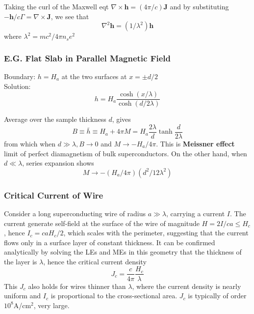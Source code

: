 \documentclass[8pt,a4paper,twocolumn]{article} %
\numberwithin{equation}{section} %
\begin{document}
			Taking the curl of the Maxwell eqt $ \nabla\times\bm h=(4 \pi/c)\bm J $ and by substituting $-\bm h/c \Gamma = \nabla\times\bm J$, we see that
			\begin{equation}
				\nabla^2\bm h=(1/\lambda^2)\bm h
			\end{equation}
			where $ \lambda^2=mc^2/4 \pi n_s e^2 $

			\subsubsection{E.G. Flat Slab in Parallel Magnetic Field} %
			\label{subs:e_g_flat_slab_in_parallel_magnetic_field}
				Boundary: $h=H_a$ at the two surfaces at $x=\pm d/2$\\
				Solution:
				\begin{equation}
					h=H_a \frac{\cosh (x/\lambda)}{\cosh(d/2 \lambda	)}
				\end{equation}

				Average over the sample thickness $d$, gives
				\begin{equation}
				B\equiv \bar h \equiv H_a +4 \pi M = H_a \frac{2 \lambda}{d}\tanh \frac{d}{2 \lambda}
				\end{equation}
				from which when $d\gg \lambda, B\rightarrow 0$ and $M\rightarrow -H_a/4 \pi $. This is \textbf{Meissner effect} limit of perfect diamagnetism of bulk superconductors. On the other hand, when $d\ll \lambda$, series expansion shows
				\begin{equation}
					M\rightarrow -(H_a/4 \pi)(d^2/12 \lambda^2)
				\end{equation}



			\subsubsection{Critical Current of Wire} %
			\label{ssub:critical_current_of_wire}
				Consider a long superconducting wire of radius $a\gg \lambda$, carrying a current $I$. The current generate self-field at the surface of the wire of magnitude $H=2I/ca \le H_c$, hence $I_c =caH_c/2 $, which scales with the perimeter, suggesting that the current flows only in a surface layer of constant thickness. It can be confirmed analytically by solving the LEs and MEs in this geometry that the thickness of the layer is $\lambda$, hence the critical current density
				\begin{equation}
					J_c=\frac{c}{4 \pi} \frac{H_c}{\lambda}
				\end{equation}
				This $J_c$ also holds for wires thinner than $\lambda$, where the current density is nearly uniform and $I_c$ is proportional to the cross-sectional area. $J_c$ is typically of order $10^8$A/cm$^2$, very large.
\end{document}
